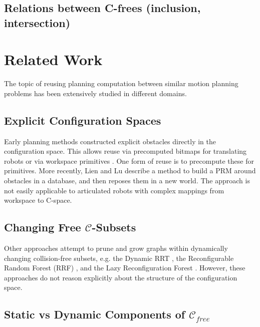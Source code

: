 \documentclass{report}
\begin{document}
\subsection{Relations between C-frees (inclusion, intersection)}

\section{Related Work}

The topic of reusing planning computation
between similar motion planning problems
has been extensively studied in different domains.

\subsection{Explicit Configuration Spaces}

Early planning methods constructed explicit obstacles
directly in the configuration space.
This allows reuse via precomputed bitmaps
for translating robots \cite{kavraki1995cspacefft}
or via workspace primitives \cite{newmanbranicky1991cspacetransforms}.
One form of reuse is to precompute these for primitives.
More recently,
Lien and Lu \cite{lien2009similarobstacles} describe a method to
build a PRM around obstacles in a database,
and then reposes them in a new world.
The approach is not easily applicable to articulated robots
with complex mappings from workspace to C-space.

\subsection{Changing Free $\mathcal{C}$-Subsets}

Other approaches attempt to prune and grow graphs
within dynamically changing collision-free subsets,
e.g. the Dynamic RRT \cite{ferguson2006drrt},
the Reconfigurable Random Forest (RRF)
\cite{li2002incrementalprmmanagement},
and the Lazy Reconfiguration Forest
\cite{gayle2007lazyreconfigforest}.
However, these approaches do not reason explicitly about the
structure of the configuration space.

\subsection{Static vs Dynamic Components of $\mathcal{C}_{free}$}
\end{document}
